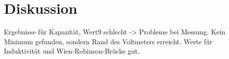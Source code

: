 \section{Diskussion}
\label{sec:Diskussion}
Ergebnisse für Kapazität, Wert9 schlecht -> Probleme bei Messung. Kein Minimum gefunden, sondern Rand des Voltmeters erreicht.
Werte für Induktivität und Wien-Robinson-Brücke gut.